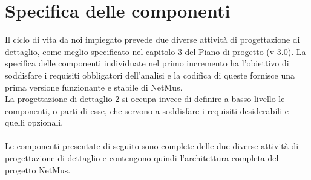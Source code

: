 \chapter{Specifica delle componenti}
\thispagestyle{fancy} %
Il ciclo di vita da noi impiegato prevede due diverse attivit\`a di
progettazione di dettaglio, come meglio specificato nel capitolo 3 del Piano di progetto (v 3.0). La specifica
delle componenti individuate nel primo incremento ha l'obiettivo di soddisfare i
requisiti obbligatori dell'analisi e la codifica di
queste fornisce una prima versione funzionante e stabile di NetMus. \\
La progettazione di dettaglio 2 si occupa invece di definire a basso livello le
componenti, o parti di esse, che servono a soddisfare i requisiti desiderabili e
quelli opzionali.\\\\
Le componenti presentate di seguito sono complete delle due diverse attivit\`a
di progettazione di dettaglio e contengono quindi l'architettura completa del
progetto NetMus.

